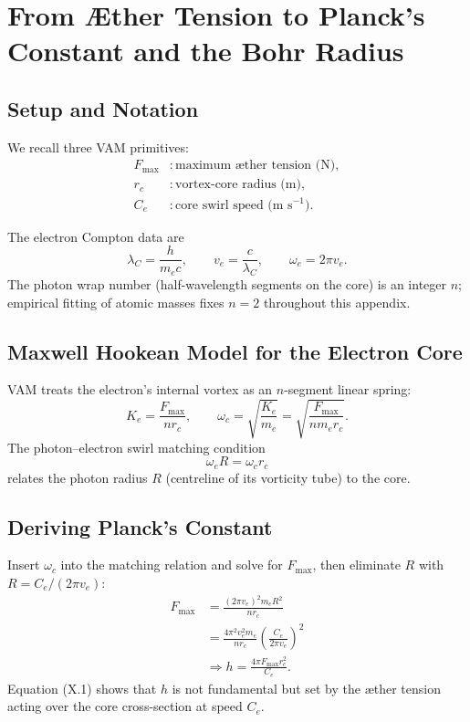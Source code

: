 
\section{From \AE ther Tension to Planck's Constant and the Bohr Radius}

\subsection{Setup and Notation}

We recall three VAM primitives:
\begin{align*}
F_{\max} & : \text{maximum \ae ther tension (N)}, \\
r_c & : \text{vortex-core radius (m)}, \\
C_e&:\text{core swirl speed (m s$^{-1}$)}.
\end{align*}

The electron Compton data are
\[
\lambda_C = \frac{h}{m_e c}, \qquad v_e = \frac{c}{\lambda_C}, \qquad \omega_e = 2\pi v_e.
\]
The photon wrap number (half-wavelength segments on the core) is an integer $n$; empirical fitting of atomic masses fixes $n=2$ throughout this appendix.

\subsection{Maxwell Hookean Model for the Electron Core}

VAM treats the electron's internal vortex as an $n$-segment linear spring:
\[
K_e = \frac{F_{\max}}{n r_c}, \qquad \omega_c = \sqrt{\frac{K_e}{m_e}} = \sqrt{\frac{F_{\max}}{n m_e r_c}}.
\]
The photon--electron swirl matching condition
\[
\omega_e R = \omega_c r_c
\]
relates the photon radius $R$ (centreline of its vorticity tube) to the core.

\subsection{Deriving Planck's Constant}

Insert $\omega_c$ into the matching relation and solve for $F_{\max}$, then eliminate $R$ with $R=C_e/(2\pi v_e)$:
\begin{align*}
F_{\max}
&= \frac{(2\pi v_e)^2 m_e R^2}{n r_c} \\
&= \frac{4\pi^2 v_e^2 m_e}{n r_c} \left( \frac{C_e}{2\pi v_e} \right)^2 \\[4pt]
&\Longrightarrow \boxed{h = \frac{4\pi F_{\max} r_c^2}{C_e}}. \tag{X.1}
\end{align*}
Equation (X.1) shows that $h$ is not fundamental but set by the \ae ther tension acting over the core cross-section at speed $C_e$.

